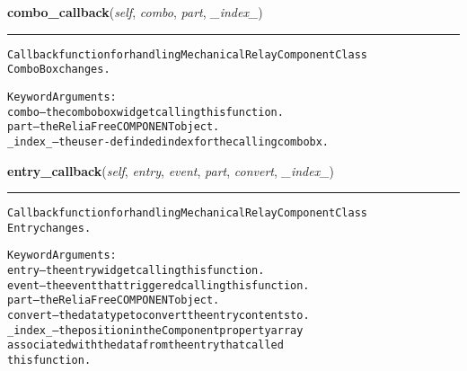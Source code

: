     \vspace{0.5ex}

\hspace{.8\funcindent}\begin{boxedminipage}{\funcwidth}

    \raggedright \textbf{combo\_callback}(\textit{self}, \textit{combo}, \textit{part}, \textit{\_index\_})

    \vspace{-1.5ex}

    \rule{\textwidth}{0.5\fboxrule}
\setlength{\parskip}{2ex}
\begin{alltt}
Callback function for handling Mechanical Relay Component Class
ComboBox changes.

Keyword Arguments:
  combo -- the combobox widget calling this function.
   part -- the ReliaFree COMPONENT object.
\_index\_ -- the user-definded index for the calling combobx.
\end{alltt}

\setlength{\parskip}{1ex}
    \end{boxedminipage}

    \label{reliafree:relays:relay:Mechanical:entry_callback}

    \vspace{0.5ex}

\hspace{.8\funcindent}\begin{boxedminipage}{\funcwidth}

    \raggedright \textbf{entry\_callback}(\textit{self}, \textit{entry}, \textit{event}, \textit{part}, \textit{convert}, \textit{\_index\_})

    \vspace{-1.5ex}

    \rule{\textwidth}{0.5\fboxrule}
\setlength{\parskip}{2ex}
\begin{alltt}
Callback function for handling Mechanical Relay Component Class
Entry changes.

Keyword Arguments:
  entry -- the entry widget calling this function.
  event -- the event that triggered calling this function.
   part -- the ReliaFree COMPONENT object.
convert -- the data type to convert the entry contents to.
\_index\_ -- the position in the Component property array
           associated with the data from the entry that called
           this function.
\end{alltt}

\setlength{\parskip}{1ex}
    \end{boxedminipage}

